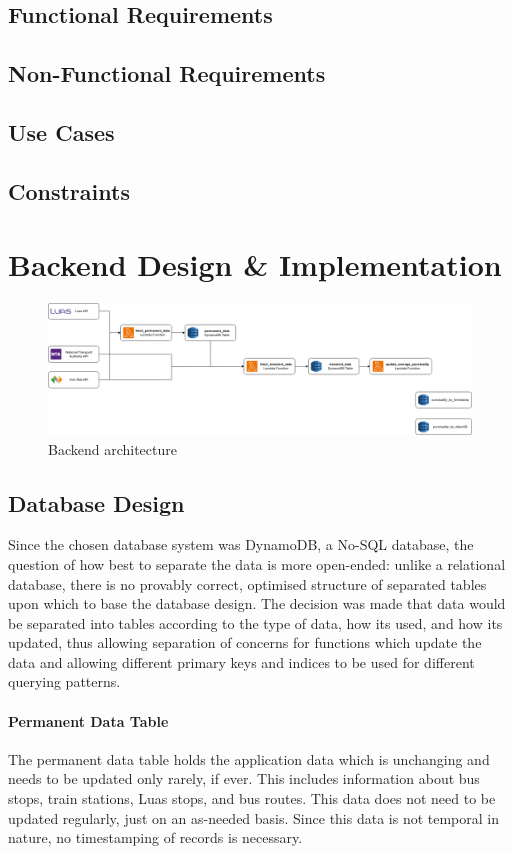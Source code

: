 \documentclass[a4paper,11pt]{report}
\begin{document}
\section{Functional Requirements}
\section{Non-Functional Requirements}
\section{Use Cases}
\section{Constraints}

\chapter{Backend Design \& Implementation}
\begin{figure}[H]
    \centering
    \includegraphics[width=\textwidth]{./images/diagram_all.png}
    \caption{Backend architecture}
\end{figure}

\section{Database Design}
Since the chosen database system was DynamoDB, a No-SQL database, the question of how best to separate the data is more open-ended: unlike a relational database, there is no provably correct, optimised structure of separated tables upon which to base the database design.
The decision was made that data would be separated into tables according to the type of data, how its used, and how its updated, thus allowing separation of concerns for functions which update the data and allowing different primary keys and indices to be used for different querying patterns.

\subsubsection{Permanent Data Table}
The permanent data table holds the application data which is unchanging and needs to be updated only rarely, if ever.
This includes information about bus stops, train stations, Luas stops, and bus routes.
This data does not need to be updated regularly, just on an as-needed basis.
Since this data is not temporal in nature, no timestamping of records is necessary.
\end{document}

